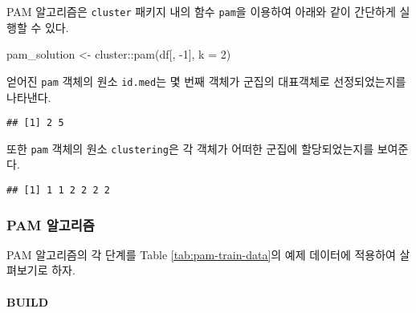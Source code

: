 \documentclass[
]{book}
\newenvironment{Shaded}{\begin{snugshade}}{\end{snugshade}}
\newcommand{\AttributeTok}[1]{\textcolor[rgb]{0.77,0.63,0.00}{#1}}
\newcommand{\DecValTok}[1]{\textcolor[rgb]{0.00,0.00,0.81}{#1}}
\newcommand{\FunctionTok}[1]{\textcolor[rgb]{0.00,0.00,0.00}{#1}}
\newcommand{\NormalTok}[1]{#1}
\newcommand{\OtherTok}[1]{\textcolor[rgb]{0.56,0.35,0.01}{#1}}
\newcommand{\SpecialCharTok}[1]{\textcolor[rgb]{0.00,0.00,0.00}{#1}}
\begin{document}
PAM 알고리즘은 \texttt{cluster} 패키지 내의 함수 \texttt{pam}을 이용하여 아래와 같이 간단하게 실행할 수 있다.

\begin{Shaded}
\begin{Highlighting}[]
\NormalTok{pam\_solution }\OtherTok{\textless{}{-}}\NormalTok{ cluster}\SpecialCharTok{::}\FunctionTok{pam}\NormalTok{(df[, }\SpecialCharTok{{-}}\DecValTok{1}\NormalTok{], }\AttributeTok{k =} \DecValTok{2}\NormalTok{)}
\end{Highlighting}
\end{Shaded}

얻어진 \texttt{pam} 객체의 원소 \texttt{id.med}는 몇 번째 객체가 군집의 대표객체로 선정되었는지를 나타낸다.

\begin{Shaded}
\end{Shaded}

\begin{verbatim}
## [1] 2 5
\end{verbatim}

또한 \texttt{pam} 객체의 원소 \texttt{clustering}은 각 객체가 어떠한 군집에 할당되었는지를 보여준다.

\begin{Shaded}
\end{Shaded}

\begin{verbatim}
## [1] 1 1 2 2 2 2
\end{verbatim}

\hypertarget{pam-algorithm}{%
\subsubsection{PAM 알고리즘}\label{pam-algorithm}}

PAM 알고리즘의 각 단계를 Table \ref{tab:pam-train-data}의 예제 데이터에 적용하여 살펴보기로 하자.

\hypertarget{pam-build}{%
\paragraph{BUILD}\label{pam-build}}
\end{document}

